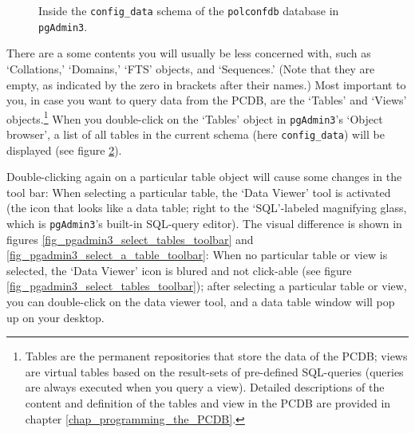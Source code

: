 \begin{figure}[ht!]
\begin{subfigure}{.45\textwidth}
    \label{fig_pgadmin3_tables_inside_config_data}
  \end{subfigure} 
  \caption{Inside the \texttt{config\_data} schema of the \texttt{polconfdb} database in \texttt{pgAdmin3}.}
\end{figure}

There are a some contents you will usually be less concerned with, such as `Collations,' `Domains,' `FTS' objects, and `Sequences.' (Note that they are empty, as indicated by the zero in brackets after their names.)
Most important to you, in case you want to query data from the PCDB, are the `Tables' and `Views' objects.\footnote{
Tables are the permanent repositories that store the data of the PCDB; views are virtual tables based on the result-sets of pre-defined SQL-queries (queries are always executed when you query a view). Detailed descriptions of the content and definition of the tables and view in the PCDB are provided in chapter \ref{chap_programming_the_PCDB}.}
When you double-click on the `Tables' object in \texttt{pgAdmin3}'s `Object browser', a list of all tables in the current schema (here \texttt{config\_data}) will be displayed (see figure \ref{fig_pgadmin3_tables_inside_config_data}).

Double-clicking again on a particular table object will cause some changes in the tool bar: When selecting a particular table, the `Data Viewer' tool is activated (the icon that looks like a data table; right to the `SQL'-labeled magnifying glass, which is \texttt{pgAdmin3}'s built-in SQL-query editor).
The visual difference is shown in figures \ref{fig_pgadmin3_select_tables_toolbar} and \ref{fig_pgadmin3_select_a_table_toolbar}: 
When no particular table or view is selected, the `Data Viewer' icon is blured and not click-able (see figure \ref{fig_pgadmin3_select_tables_toolbar}); after selecting a particular table or view, you can double-click on the data viewer tool, and a data table window will pop up on your desktop.

